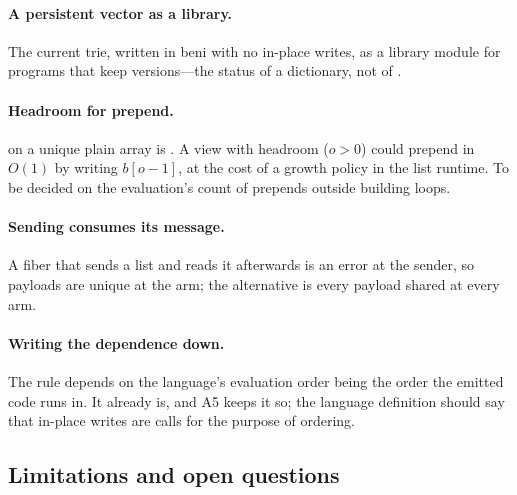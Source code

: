 \paragraph{A persistent vector as a library.} The current trie, written in beni with no in-place
writes, as a library module for programs that keep versions---the status of a dictionary, not of
.

\paragraph{Headroom for prepend.} \code{[ x, …xs ]} on a unique plain array is . A view
with headroom ($o > 0$) could prepend in $O(1)$ by writing $b[o - 1]$, at the cost of a growth policy in
the list runtime. To be decided on the evaluation's count of prepends outside building loops.

\paragraph{Sending consumes its message.} A fiber that sends a list and reads it afterwards is an error
at the sender, so payloads are unique at the arm; the alternative is every payload shared at every arm.

\paragraph{Writing the dependence down.} The rule depends on the language's evaluation order being the
order the emitted code runs in. It already is, and A5 keeps it so; the language definition should say
that in-place writes are calls for the purpose of ordering.

\subsection{Limitations and open questions}
\label{sec:disc-open}

